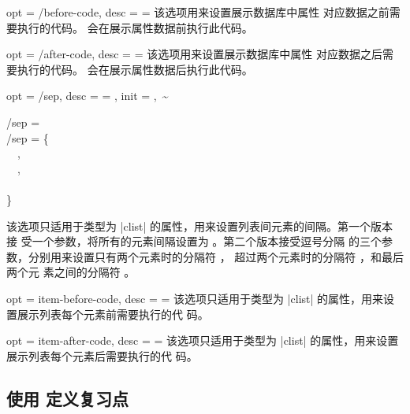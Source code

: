 \documentclass[full]{l3doc}
\begin{document}
\begin{documentation}
\begin{option}{
  opt = {/before-code},
  desc = {= }
}
  该选项用来设置展示数据库中属性  对应数据之前需要执行的代码。
   会在展示属性数据前执行此代码。
\end{option}

\begin{option}{
  opt = {/after-code},
  desc = {= }
}
  该选项用来设置展示数据库中属性  对应数据之后需要执行的代码。
   会在展示属性数据后执行此代码。
\end{option}

\begin{option}{
  opt = {/sep},
  desc = {= },
  init = {,~\~}
}
\begin{Syntax}
  /sep =  \\
  /sep = \{ \\
  ~~, \\
  ~~, \\
  ~~ \\
  \}
\end{Syntax}

  该选项只适用于类型为 |clist| 的属性，用来设置列表间元素的间隔。第一个版本接
  受一个参数，将所有的元素间隔设置为 。第二个版本接受逗号分隔
  的三个参数，分别用来设置只有两个元素时的分隔符 ，
  超过两个元素时的分隔符 ，和最后两个元
  素之间的分隔符 。

\end{option}

\begin{option}{
  opt = item-before-code,
  desc = {= }
}
  该选项只适用于类型为 |clist| 的属性，用来设置展示列表每个元素前需要执行的代
  码。
\end{option}

\begin{option}{
  opt = item-after-code,
  desc = {= }
}
  该选项只适用于类型为 |clist| 的属性，用来设置展示列表每个元素后需要执行的代
  码。
\end{option}

\subsection{使用  定义复习点}


\end{documentation}
\end{document}
